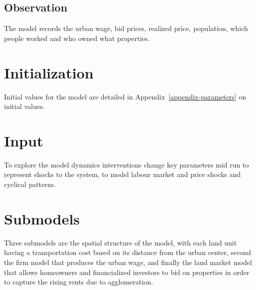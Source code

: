 \subsection{Observation}
The model records the urban wage, bid prices, realized price, population, which people worked and who owned what properties.

\section{Initialization}
Initial values for the model are detailed in Appendix~\ref{appendix-parameters} on initial values.

\section{Input}
To explore the model dynamics interventions change key parameters mid run to represent shocks to the system, to model labour market and price shocks and cyclical patterns. %

\section{Submodels}
Three submodels are the spatial structure of the model, with each land unit having a transportation cost based on its distance from the urban center, second the firm model that produces the urban wage, and finally the land market model that allows homeowners and financialized investors to bid on properties in order to capture the rising rents due to agglomeration.  
